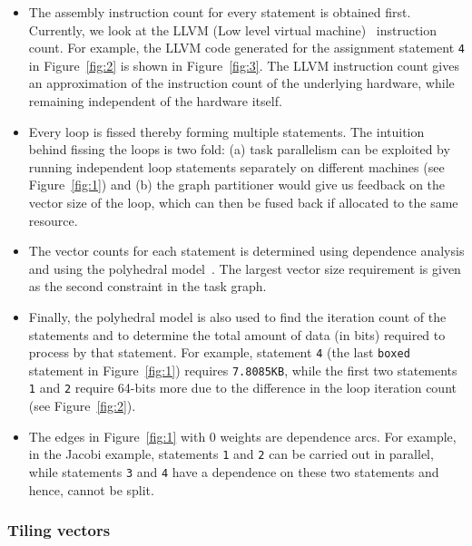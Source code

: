 \begin{itemize}

\item The assembly instruction count for every statement is obtained
  first. Currently, we look at the LLVM (Low level virtual
  machine)~\cite{clat04} instruction count. For example, the LLVM code
  generated for the assignment statement \texttt{4} in
  Figure~\ref{fig:2} is shown in Figure~\ref{fig:3}. The LLVM
  instruction count gives an approximation of the instruction count of
  the underlying hardware, while remaining independent of the hardware
  itself.

\item Every loop is fissed thereby forming multiple statements. The
  intuition behind fissing the loops is two fold: (a) task parallelism
  can be exploited by running independent loop statements separately on
  different machines (see Figure~\ref{fig:1}) and (b) the graph
  partitioner would give us feedback on the vector size of the loop,
  which can then be fused back if allocated to the same resource.

\item The vector counts for each statement is determined using
  dependence analysis and using the polyhedral model~\cite{mgri98}. The
  largest vector size requirement is given as the second constraint in
  the task graph.

\item Finally, the polyhedral model is also used to find the iteration
  count of the statements and to determine the total amount of data (in
  bits) required to process by that statement. For example, statement
  \texttt{4} (the last \texttt{boxed} statement in Figure~\ref{fig:1})
  requires \texttt{7.8085KB}, while the first two statements \texttt{1}
  and \texttt{2} require 64-bits more due to the difference in the loop
  iteration count (see Figure~\ref{fig:2}).

\item The edges in Figure~\ref{fig:1} with 0 weights are dependence
  arcs. For example, in the Jacobi example, statements \texttt{1} and
  \texttt{2} can be carried out in parallel, while statements
  \texttt{3} and \texttt{4} have a dependence on these two statements
  and hence, cannot be split.

\end{itemize}

\subsubsection{Tiling vectors}
\label{sec:tiling-vector-counts}

